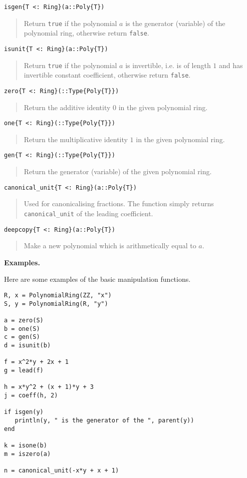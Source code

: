 \documentclass[a4paper,10pt]{article}
\newcommand{\code}{\lstinline}
\newcommand{\desc}[1]{\vspace{-3mm}\begin{quote}#1\end{quote}}
\begin{document}
\begin{lstlisting}
isgen{T <: Ring}(a::Poly{T})
\end{lstlisting}

\desc{Return \code{true} if the polynomial $a$ is the generator (variable) of the
polynomial ring, otherwise return \code{false}.}

\begin{lstlisting}
isunit{T <: Ring}(a::Poly{T})
\end{lstlisting}

\desc{Return \code{true} if the polynomial $a$ is invertible, i.e. is of length
$1$ and has invertible constant coefficient, otherwise return \code{false}.}

\begin{lstlisting}
zero{T <: Ring}(::Type{Poly{T}})
\end{lstlisting}

\desc{Return the additive identity $0$ in the given polynomial ring.}

\begin{lstlisting}
one{T <: Ring}(::Type{Poly{T}})
\end{lstlisting}

\desc{Return the multiplicative identity $1$ in the given polynomial ring.}

\begin{lstlisting}
gen{T <: Ring}(::Type{Poly{T}})
\end{lstlisting}

\desc{Return the generator (variable) of the given polynomial ring.}

\begin{lstlisting}
canonical_unit{T <: Ring}(a::Poly{T})
\end{lstlisting}

\desc{Used for canonicalising fractions. The function simply returns
\code{canonical_unit} of the leading coefficient.}

\begin{lstlisting}
deepcopy{T <: Ring}(a::Poly{T})
\end{lstlisting}

\desc{Make a new polynomial which is arithmetically equal to $a$.}

\textbf{Examples.}

Here are some examples of the basic manipulation functions.

\begin{lstlisting}
R, x = PolynomialRing(ZZ, "x")
S, y = PolynomialRing(R, "y")

a = zero(S)
b = one(S)
c = gen(S)
d = isunit(b)

f = x^2*y + 2x + 1
g = lead(f)

h = x*y^2 + (x + 1)*y + 3
j = coeff(h, 2)

if isgen(y)
   println(y, " is the generator of the ", parent(y))
end

k = isone(b)
m = iszero(a)

n = canonical_unit(-x*y + x + 1)
\end{lstlisting}
\end{document}
